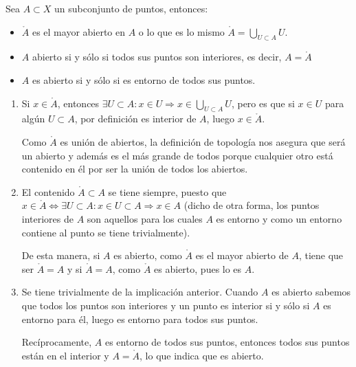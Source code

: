\begin{prop}
Sea $A\subset X$ un subconjunto de puntos, entonces:
\begin{itemize}
\item $\mathring{A}$ es el mayor abierto en $A$ o lo que es lo mismo $ \mathring{A} = \bigcup_{U \subset A} U$.
\item $A$ abierto si y sólo si todos sus puntos son interiores, es decir, $A = \mathring{A}$
\item $A$ es abierto si y sólo si es entorno de todos sus puntos.
\end{itemize}
\end{prop}
\begin{demo}
\begin{enumerate}
    \item Si $x\in \mathring{A}$, entonces $\exists U \subset A : x\in U \Rightarrow x\in \bigcup_{U\subset A}U$, pero es que si $x\in U$ para algún $U\subset A$, por definición es interior de $A$, luego $x\in \mathring{A}$.
   
   Como $\mathring{A}$ es unión de abiertos, la definición de topología nos asegura que será un abierto y además es el más grande de todos porque cualquier otro está contenido en él por ser la unión de todos los abiertos.   
   \item El contenido $\mathring{A}\subset A$ se tiene siempre, puesto que $x\in \mathring{A}\Leftrightarrow \exists U \subset A : x\in U \subset A \Rightarrow x\in A$ (dicho de otra forma, los puntos interiores de $A$ son aquellos para los cuales $A$ es entorno y como un entorno contiene al punto se tiene trivialmente).
   
   De esta manera, si $A$ es abierto, como $\mathring{A}$ es el mayor abierto de $A$, tiene que ser $\mathring{A} = A$ y si $\mathring{A} = A$, como $\mathring{A}$ es abierto, pues lo es $A$.
    
   \item Se tiene trivialmente de la implicación anterior. Cuando $A$ es abierto sabemos que todos los puntos son interiores y un punto es interior si y sólo si $A$ es entorno para él, luego es entorno para todos sus puntos.
   
   Recíprocamente, $A$ es entorno de todos sus puntos, entonces todos sus puntos están en el interior y $A = \mathring{A}$, lo que indica que es abierto.
\end{enumerate}
\end{demo}


